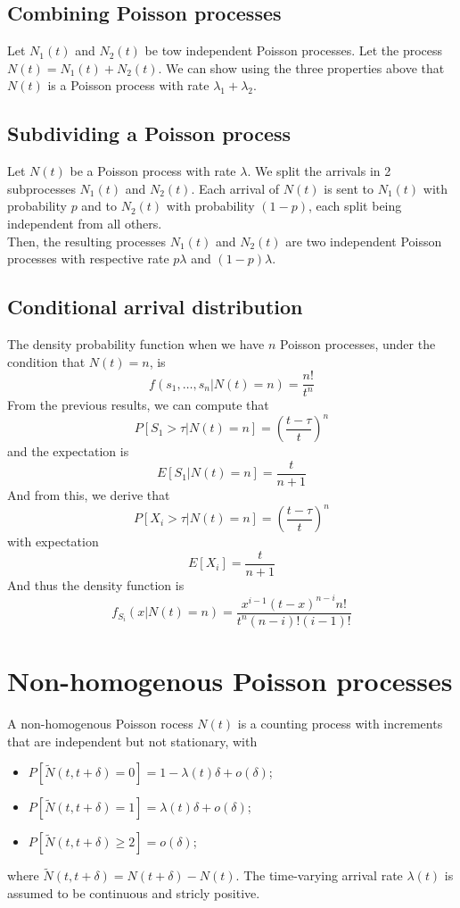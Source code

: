 \documentclass[12pt, openany]{report}
\theoremstyle{definition}
\begin{document}
\subsection{Combining Poisson processes}
Let $N_1(t)$ and $N_2(t)$ be tow independent Poisson processes. Let the process $N(t)=N_1(t)+N_2(t)$. We can show using the three properties above that $N(t)$ is a Poisson process with rate $\lambda_1+\lambda_2$.
\subsection{Subdividing a Poisson process}
Let $N(t)$ be a Poisson process with rate $\lambda$. We split the arrivals in 2 subprocesses $N_1(t)$ and $N_2(t)$. Each arrival of $N(t)$ is sent to $N_1(t)$ with probability $p$ and to $N_2(t)$ with probability $(1-p)$, each split being independent from all others. \\
Then, the resulting processes $N_1(t)$ and $N_2(t)$ are two independent Poisson processes with respective rate $p\lambda$ and $(1-p)\lambda$.
\subsection{Conditional arrival distribution}
The density probability function when we have $n$ Poisson processes, under the condition that $N(t)=n$, is
\begin{equation}
  f(s_1,\dots,s_n|N(t)=n)=\frac{n!}{t^n}
\end{equation}
From the previous results, we can compute that 
\begin{equation}
  P[S_1>\tau|N(t)=n]=\left(\frac{t-\tau}{t}\right)^n
\end{equation}
and the expectation is 
\begin{equation}
  E[S_1|N(t)=n] = \frac{t}{n+1}
\end{equation}
And from this, we derive that 
\begin{equation}
  P[X_i>\tau|N(t)=n] = \left(\frac{t-\tau}{t}\right)^n
\end{equation}
with expectation 
\begin{equation}
  E[X_i] = \frac{t}{n+1}
\end{equation}
And thus the density function is 
\begin{equation}
  f_{S_i}(x|N(t)=n) = \frac{x^{i-1}(t-x)^{n-i}n!}{t^n (n-i)!(i-1)!}
\end{equation}
\section{Non-homogenous Poisson processes}
A non-homogenous Poisson rocess $N(t)$ is a counting process with increments that are independent but not stationary, with
\begin{itemize}
  \item $P[\tilde N(t,t+\delta)=0]=1-\lambda (t)\delta + o(\delta)$;
  \item $P[\tilde N(t,t+\delta)=1]=\lambda (t)\delta + o(\delta)$;
  \item $P[\tilde N(t,t+\delta)\ge2]=o(\delta)$;
\end{itemize}
where $\tilde N(t,t+\delta)=N(t+\delta)-N(t)$. The time-varying arrival rate $\lambda(t)$ is assumed to be continuous and stricly positive.
\end{document}
